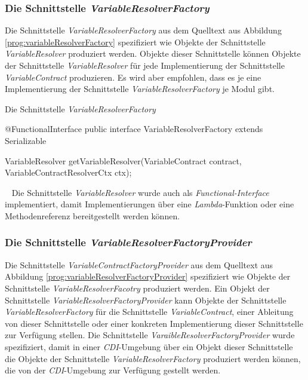 \subsubsection{Die Schnittstelle \emph{VariableResolverFactory}}
\label{sec:variableResolverFactory}
Die Schnittstelle \emph{VariableResolverFactory} aus dem Quelltext aus Abbildung \ref{prog:variableResolverFactory}  spezifiziert wie Objekte der Schnittstelle \emph{VariableResolver} produziert werden. Objekte dieser Schnittstelle können Objekte der Schnittstelle \emph{VariableResolver} für jede Implementierung der Schnittstelle \emph{VariableContract} produzieren. Es wird aber empfohlen, dass es je eine Implementierung der Schnittstelle \emph{VariableResolverFactory} je Modul gibt.
\newpage

\begin{program}
\caption{Die Schnittstelle \emph{VariableResolverFactory}}
\label{prog:variableResolverFactory}
\begin{JavaCode}
@FunctionalInterface
public interface VariableResolverFactory extends Serializable {

  VariableResolver getVariableResolver(VariableContract contract,
                                       VariableContractResolverCtx ctx);
}
\end{JavaCode}
\end{program}
\ \newline
Die Schnittstelle \emph{VariableResolver} wurde auch als \emph{Functional-Interface} implementiert, damit Implementierungen über eine \emph{Lambda}-Funktion oder eine Methodenreferenz bereitgestellt werden können.

\subsubsection{Die Schnittstelle \emph{VariableResolverFactoryProvider}}
\label{sec:VariableResolverFactoryProvider}
Die Schnittstelle \emph{VariableContractFactoryProvider} aus dem Quelltext aus Abbildung \ref{prog:variableResolverFactoryProvider} spezifiziert wie Objekte der Schnittstelle \emph{VariableResolverFacotry} produziert werden. Ein Objekt der Schnittstelle \emph{VariableResolverFactoryProvider} kann Objekte der Schnittstelle \emph{VariableResolverFactory} für die Schnittstelle \emph{VariableContract}, einer Ableitung von dieser Schnittstelle oder einer konkreten Implementierung dieser Schnittstelle zur Verfügung stellen. Die Schnittstelle \emph{VaraibleResolverFactoryProvider} wurde spezifiziert, damit in einer \emph{CDI}-Umgebung über ein Objekt dieser Schnittstelle die Objekte der Schnittstelle \emph{VariableResolverFactory} produziert werden können, die von der \emph{CDI}-Umgebung zur Verfügung gestellt werden.

